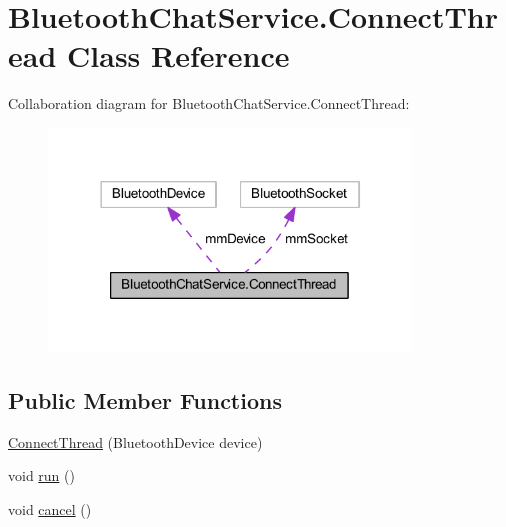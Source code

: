 \hypertarget{classcom_1_1example_1_1android_1_1_bluetooth_chat_1_1_bluetooth_chat_service_1_1_connect_thread}{\section{Bluetooth\-Chat\-Service.\-Connect\-Thread Class Reference}
\label{classcom_1_1example_1_1android_1_1_bluetooth_chat_1_1_bluetooth_chat_service_1_1_connect_thread}
}


Collaboration diagram for Bluetooth\-Chat\-Service.\-Connect\-Thread\-:\nopagebreak
\begin{figure}[H]
\begin{center}
\leavevmode
\includegraphics[width=273pt]{classcom_1_1example_1_1android_1_1_bluetooth_chat_1_1_bluetooth_chat_service_1_1_connect_thread__coll__graph}
\end{center}
\end{figure}
\subsection*{Public Member Functions}
\begin{DoxyCompactItemize}
\item 
\hyperlink{classcom_1_1example_1_1android_1_1_bluetooth_chat_1_1_bluetooth_chat_service_1_1_connect_thread_a44953b58b3e56284605861cd8dc6c1b6}{Connect\-Thread} (Bluetooth\-Device device)
\item 
void \hyperlink{classcom_1_1example_1_1android_1_1_bluetooth_chat_1_1_bluetooth_chat_service_1_1_connect_thread_a13a43e6d814de94978c515cb084873b1}{run} ()
\item 
void \hyperlink{classcom_1_1example_1_1android_1_1_bluetooth_chat_1_1_bluetooth_chat_service_1_1_connect_thread_a02d5fa6b14e221f3012a794b905be166}{cancel} ()
\end{DoxyCompactItemize}
